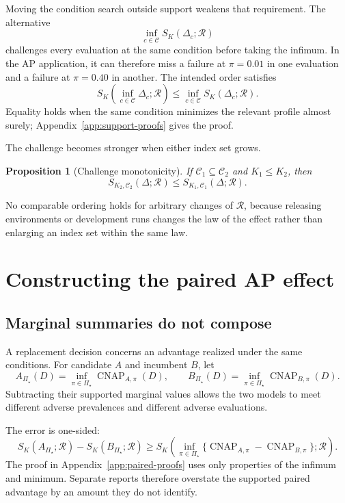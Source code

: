 \documentclass[11pt]{article}
\newcommand{\CNAP}{\operatorname{CNAP}}
\newcommand{\Regime}{\mathcal{R}}
\newcommand{\CSet}{\mathcal{C}}
\newcommand{\PSet}{\Pi_\star}
\newtheorem{proposition}{Proposition}
\theoremstyle{remark}
\begin{document}
Moving the condition search outside support weakens that requirement. The alternative
\[
\inf_{c\in\CSet}S_K(\Delta_c;\Regime)
\]
challenges every evaluation at the same condition before taking the infimum. In the AP application, it can therefore miss a failure at $\pi=0.01$ in one evaluation and a failure at $\pi=0.40$ in another. The intended order satisfies
\begin{equation}
S_K\left(
\inf_{c\in\CSet}\Delta_c;\Regime
\right)
\leq
\inf_{c\in\CSet}
S_K(\Delta_c;\Regime).
\label{eq:order}
\end{equation}
Equality holds when the same condition minimizes the relevant profile almost surely; Appendix~\ref{app:support-proofs} gives the proof.

The challenge becomes stronger when either index set grows.

\begin{proposition}[Challenge monotonicity]
\label{prop:monotonicity}
If $\mathcal C_1\subseteq\mathcal C_2$ and $K_1\leq K_2$, then
\[
S_{K_2,\mathcal C_2}(\Delta;\Regime)
\leq
S_{K_1,\mathcal C_1}(\Delta;\Regime).
\]
\end{proposition}

No comparable ordering holds for arbitrary changes of $\Regime$, because releasing environments or development runs changes the law of the effect rather than enlarging an index set within the same law.

\section{Constructing the paired AP effect}
\label{sec:paired}

\subsection{Marginal summaries do not compose}

A replacement decision concerns an advantage realized under the same conditions. For candidate $A$ and incumbent $B$, let
\[
A_{\PSet}(D)
=
\inf_{\pi\in\PSet}\CNAP_{A,\pi}(D),
\qquad
B_{\PSet}(D)
=
\inf_{\pi\in\PSet}\CNAP_{B,\pi}(D).
\]
Subtracting their supported marginal values allows the two models to meet different adverse prevalences and different adverse evaluations.

The error is one-sided:
\begin{equation}
S_K(A_{\PSet};\Regime)
-
S_K(B_{\PSet};\Regime)
\geq
S_K\left(
\inf_{\pi\in\PSet}
\{\CNAP_{A,\pi}-\CNAP_{B,\pi}\};
\Regime
\right).
\label{eq:noncomposition}
\end{equation}
The proof in Appendix~\ref{app:paired-proofs} uses only properties of the infimum and minimum. Separate reports therefore overstate the supported paired advantage by an amount they do not identify.
\end{document}
